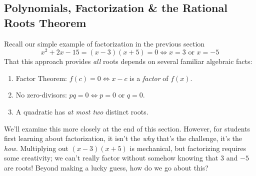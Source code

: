 \clearpage



\subsection{Polynomials, Factorization \& the Rational Roots Theorem}

Recall our simple example of factorization in the previous section
\[x^2+2x-15=(x-3)(x+5)=0\iff x=3\text{ or }x=-5\]
That this approach provides \emph{all} roots depends on several familiar algebraic facts:
\begin{enumerate}
  \item Factor Theorem: $f(c)=0\iff x-c$ is a \emph{factor} of $f(x)$.
  \item No zero-divisors: $pq=0\iff p=0$ or $q=0$. 
  \item A quadratic has \emph{at most two} distinct roots.
\end{enumerate}
We'll examine this more closely at the end of this section. However, for students first learning about factorization, it isn't the \emph{why} that's the challenge, it's the \emph{how.} Multiplying out $(x-3)(x+5)$ is mechanical, but factorizing requires some creativity; we can't really factor without somehow knowing that 3 and $-5$ are roots! Beyond making a lucky guess, how do we go about this? 

